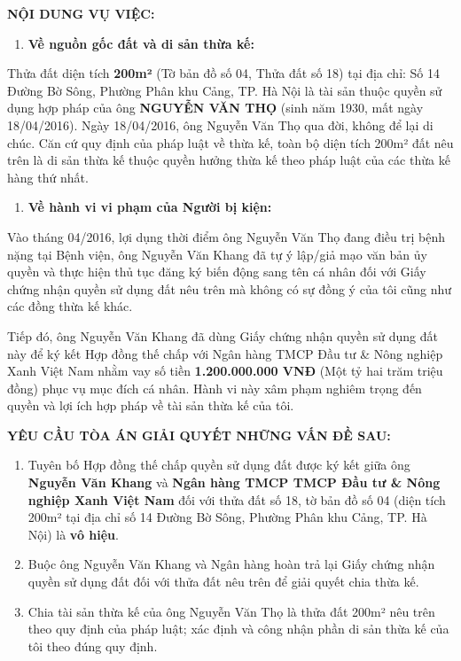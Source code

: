 \documentclass[12pt,a4paper]{article}
\begin{document}
\vspace{0.3cm}\noindent\textbf{\large NỘI DUNG VỤ VIỆC:}\\[0.15cm]


\begin{enumerate}[label=\arabic*., leftmargin=*, itemsep=2pt, topsep=2pt, parsep=0pt]
  \item \textbf{Về nguồn gốc đất và di sản thừa kế:}
\end{enumerate}
Thửa đất diện tích \textbf{200m²} (Tờ bản đồ số 04, Thửa đất số 18) tại địa chỉ: Số 14 Đường Bờ Sông, Phường Phân khu Cảng, TP. Hà Nội là tài sản thuộc quyền sử dụng hợp pháp của ông \textbf{NGUYỄN VĂN THỌ} (sinh năm 1930, mất ngày 18/04/2016). Ngày 18/04/2016, ông Nguyễn Văn Thọ qua đời, không để lại di chúc. Căn cứ quy định của pháp luật về thừa kế, toàn bộ diện tích 200m² đất nêu trên là di sản thừa kế thuộc quyền hưởng thừa kế theo pháp luật của các thừa kế hàng thứ nhất.


\begin{enumerate}[label=\arabic*., leftmargin=*, itemsep=2pt, topsep=2pt, parsep=0pt]
  \item \textbf{Về hành vi vi phạm của Người bị kiện:}
\end{enumerate}
Vào tháng 04/2016, lợi dụng thời điểm ông Nguyễn Văn Thọ đang điều trị bệnh nặng tại Bệnh viện, ông Nguyễn Văn Khang đã tự ý lập/giả mạo văn bản ủy quyền và thực hiện thủ tục đăng ký biến động sang tên cá nhân đối với Giấy chứng nhận quyền sử dụng đất nêu trên mà không có sự đồng ý của tôi cũng như các đồng thừa kế khác.


Tiếp đó, ông Nguyễn Văn Khang đã dùng Giấy chứng nhận quyền sử dụng đất này để ký kết Hợp đồng thế chấp với Ngân hàng TMCP Đầu tư \& Nông nghiệp Xanh Việt Nam nhằm vay số tiền \textbf{1.200.000.000 VNĐ} (Một tỷ hai trăm triệu đồng) phục vụ mục đích cá nhân. Hành vi này xâm phạm nghiêm trọng đến quyền và lợi ích hợp pháp về tài sản thừa kế của tôi.




\vspace{0.3cm}\noindent\textbf{\large YÊU CẦU TÒA ÁN GIẢI QUYẾT NHỮNG VẤN ĐỀ SAU:}\\[0.15cm]


\begin{enumerate}[label=\arabic*., leftmargin=*, itemsep=2pt, topsep=2pt, parsep=0pt]
  \item Tuyên bố Hợp đồng thế chấp quyền sử dụng đất được ký kết giữa ông \textbf{Nguyễn Văn Khang} và \textbf{Ngân hàng TMCP TMCP Đầu tư \& Nông nghiệp Xanh Việt Nam} đối với thửa đất số 18, tờ bản đồ số 04 (diện tích 200m² tại địa chỉ số 14 Đường Bờ Sông, Phường Phân khu Cảng, TP. Hà Nội) là \textbf{vô hiệu}.
  \item Buộc ông Nguyễn Văn Khang và Ngân hàng hoàn trả lại Giấy chứng nhận quyền sử dụng đất đối với thửa đất nêu trên để giải quyết chia thừa kế.
  \item Chia tài sản thừa kế của ông Nguyễn Văn Thọ là thửa đất 200m² nêu trên theo quy định của pháp luật; xác định và công nhận phần di sản thừa kế của tôi theo đúng quy định.


\end{enumerate}
\end{document}

